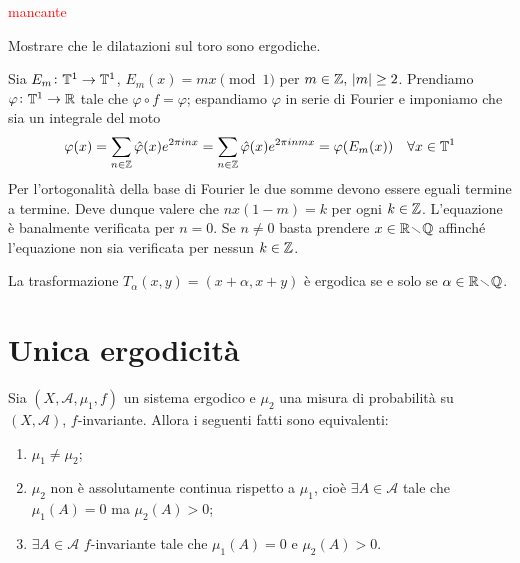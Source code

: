 \begin{example}
    \textcolor{red}{mancante}
\end{example}

\begin{exercise}
    Mostrare che le dilatazioni sul toro sono ergodiche.
\end{exercise}
\begin{solution}
    Sia $ E_m\colon\mathbb{T}^1\to\mathbb{T}^1 $, $ E_m(x) = mx\pmod{1} $ per $ m\in\mathbb{Z},\ \abs{m} \geq 2 $. Prendiamo $ \varphi\colon\mathbb{T}^1\to\mathbb{R} $ tale che $ \varphi\circ f = \varphi $; espandiamo $ \varphi $ in serie di Fourier e imponiamo che sia un integrale del moto
    \[ \varphi(x) = \sum_{n\in\mathbb{Z}} \hat\varphi(x) e^{2\pi i n x} = \sum_{n\in\mathbb{Z}} \hat\varphi(x) e^{2\pi i n m x} = \varphi(E_m(x)) \quad \forall x\in\mathbb{T}^1 \]
    Per l'ortogonalità della base di Fourier le due somme devono essere eguali termine a termine. Deve dunque valere che $ nx(1-m) = k $ per ogni $ k\in\mathbb{Z} $. L'equazione è banalmente verificata per $ n = 0 $. Se $ n\neq 0 $ basta prendere $ x\in\mathbb{R}\!\smallsetminus\!\mathbb{Q} $ affinché l'equazione non sia verificata per nessun $ k\in\mathbb{Z} $.
\end{solution}

\begin{exercise}
    La trasformazione $ T_\alpha(x, y) = (x+\alpha, x+y) $ è ergodica se e solo se $ \alpha \in \mathbb{R} \!\smallsetminus\! \mathbb{Q} $.
\end{exercise}

\section{Unica ergodicità}

\begin{proposition}
    Sia $ (X, \mathcal{A}, \mu_1, f) $ un sistema ergodico e $ \mu_2 $ una misura di probabilità su $ (X, \mathcal{A}) $, $ f $-invariante. Allora i seguenti fatti sono equivalenti:
    \begin{enumerate}[label=(\roman*)]
        \item $ \mu_1 \neq \mu_2 $;
        \item $ \mu_2 $ non è assolutamente continua rispetto a $ \mu_1 $, cioè $ \exists A \in \mathcal{A} $ tale che $ \mu_1(A) = 0 $ ma $ \mu_2(A) > 0 $;
        \item $ \exists A \in \mathcal{A} $ $ f $-invariante tale che $ \mu_1(A) = 0 $ e $ \mu_2(A) > 0 $.
    \end{enumerate}
\end{proposition}

